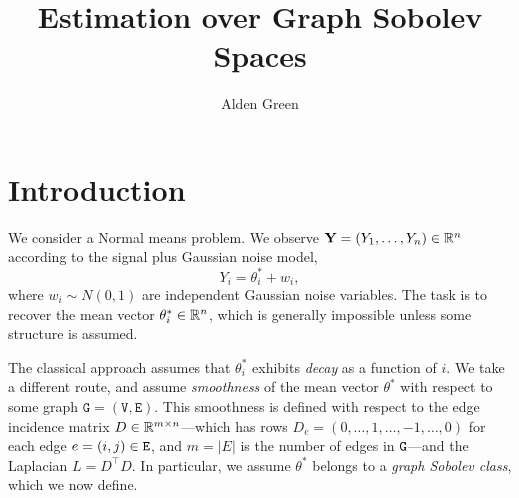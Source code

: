 \documentclass{article}
\begin{document}
	\title{Estimation over Graph Sobolev Spaces}
	\author{Alden Green}
	\maketitle
	
	\tableofcontents
	
	\section{Introduction}
	We consider a Normal means problem. We observe ${\bf Y} = (Y_1,\ldots,Y_n) \in \mathbb{R}^n$ according to the signal plus Gaussian noise model,
	\begin{equation}
	Y_i = \theta_i^{\ast} + w_i,
	\end{equation}
	where $w_i \sim N(0,1)$ are independent Gaussian noise variables. The task is to recover the mean vector $\theta_i^{\ast} \in \mathbb{R}^n$, which is generally impossible unless some structure is assumed.
	
	The classical approach assumes that $\theta_i^{\ast}$ exhibits \emph{decay} as a function of $i$. We take a different route, and assume \emph{smoothness} of the mean vector $\theta^{\ast}$ with respect to some graph $\texttt{G} = (\texttt{V},\texttt{E})$. This smoothness is defined with respect to the edge incidence matrix $D \in \mathbb{R}^{m \times n}$---which has rows $D_{e} = (0,\ldots,1,\ldots,-1,\ldots,0)$ for each edge $e = (i,j) \in \texttt{E}$, and $m = |E|$ is the number of edges in $\texttt{G}$---and the Laplacian $L = D^{\top}D$. In particular, we assume $\theta^{\ast}$ belongs to a \emph{graph Sobolev class}, which we now define.
	
\end{document}
